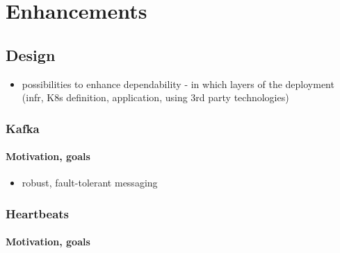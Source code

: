 \chapter{Enhancements}

\section{Design}

\begin{itemize}
	\item possibilities to enhance dependability - in which layers of the deployment (infr, K8s definition, application, using 3rd party technologies)
\end{itemize}

\subsection{Kafka}

\subsubsection{Motivation, goals}

\begin{itemize}
	\item robust, fault-tolerant messaging
\end{itemize}

\subsection{Heartbeats}

\subsubsection{Motivation, goals}

